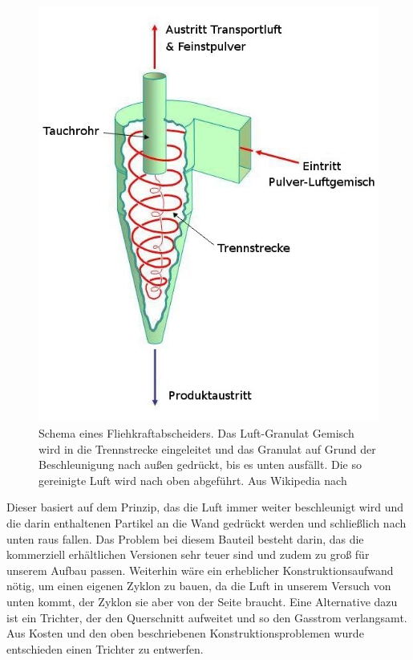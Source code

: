 \begin{figure}[h!]
	\begin{center}
		\includegraphics[scale=0.4]{Umsetzung_Fliehkraftabscheider.jpg}
		\caption[Funktionsweise Fliehkraftabscheider]{Schema eines Fliehkraftabscheiders. Das Luft-Granulat Gemisch wird in die Trennstrecke eingeleitet und das Granulat auf Grund der Beschleunigung nach außen gedrückt, bis es unten ausfällt. Die so gereinigte Luft wird nach oben abgeführt. Aus Wikipedia nach \cite{Loeffler1988}}
	\end{center}
\end{figure}

Dieser basiert auf dem Prinzip, das die Luft immer weiter beschleunigt wird und die darin enthaltenen Partikel an die Wand gedrückt werden und schließlich nach unten raus fallen. Das Problem bei diesem Bauteil besteht darin, das die kommerziell erhältlichen Versionen sehr teuer sind und zudem zu groß für unserem Aufbau passen. 
Weiterhin wäre ein erheblicher Konstruktionsaufwand nötig, um einen eigenen Zyklon zu bauen, da die Luft in unserem Versuch von unten kommt, der Zyklon sie aber von der Seite braucht. Eine Alternative dazu ist ein Trichter, der den Querschnitt aufweitet und so den Gasstrom verlangsamt. Aus Kosten und den oben beschriebenen Konstruktionsproblemen wurde entschieden einen Trichter zu entwerfen.



